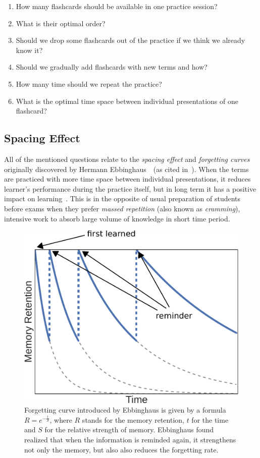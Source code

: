 \documentclass[table,color,cover,twoside,nolot,nolof]{fithesis3/fithesis3}
\begin{document}
\begin{enumerate}
	\item How many flashcards should be available in one practice session?
	\item What is their optimal order?
	\item Should we drop some flashcards out of the practice if we think we already know it?
	\item Should we gradually add flashcards with new terms and how?
	\item How many time should we repeat the practice?
	\item What is the optimal time space between individual presentations of one flashcard?
\end{enumerate}

\subsection{Spacing Effect}
\label{section:spacing_effect}
All of the mentioned questions relate to the \emph{spacing
effect} and \emph{forgetting curves} originally discovered by Hermann
Ebbinghaus~\cite{ebbinghaus1885spacing}~(as cited
in~\cite{pavlik2005practice}). When the terms are practiced with more time
space between individual presentations, it reduces learner's performance during the
practice itself, but in long term it has a positive impact on
learning~\cite{maass2015how, kornell2009optimising}. This is in the opposite of
usual preparation of students before exams when they prefer \emph{massed
repetition} (also known as \emph{cramming}), intensive work to absorb large
volume of knowledge in short time period.

\begin{figure}
	\begin{center}
		\includegraphics[width=.6\textwidth]{figure/forgetting_curves}
		\caption{Forgetting curve introduced by Ebbinghaus is given by a
			formula $R = e^{-\frac{t}{S}}$, where $R$ stands for the memory retention, $t$
			for the time and $S$ for the relative strength of memory. Ebbinghaus
			found realized that when the information is reminded again, it strengthens
			not only the memory, but also also reduces the forgetting rate.}
	\end{center}
\end{figure}
\end{document}
